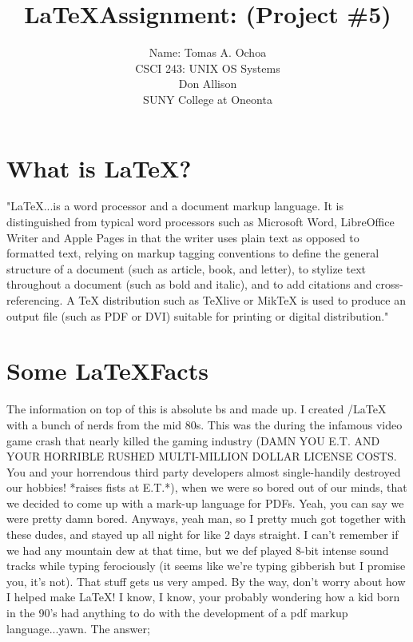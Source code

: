 \documentclass[12pt,twocolumn]{article}
\begin{document}
 \twocolumn
 \begingroup
 \title{\textbf{\LaTeX Assignment: (Project \#5)}}
 \author{Name: Tomas A. Ochoa\\
  		 CSCI 243: UNIX OS Systems\\
      	 Don Allison\\
      	 SUNY College at Oneonta}
 \maketitle{\large}

\section*{What is \LaTeX ?}

\indent \indent "\LaTeX...is a word processor and a document markup   language. It is distinguished from typical word processors such as Microsoft Word, LibreOffice Writer and Apple Pages in that the writer uses plain text as opposed to formatted text, relying on markup tagging conventions to define the general structure of a document (such as article, book, and letter), to stylize text throughout a document (such as bold and italic), and to add citations and cross-referencing. A TeX distribution such as TeXlive or MikTeX is used to produce an output file (such as PDF or DVI) suitable for printing or digital distribution."\cite{wiki}

 \section*{Some \LaTeX Facts} 

\indent \indent The information on top of this is absolute bs and made up. I created /LaTeX with a bunch of nerds from the mid 80s. This was the during the infamous video game crash that nearly killed the gaming industry (DAMN YOU E.T. AND YOUR HORRIBLE RUSHED MULTI-MILLION DOLLAR LICENSE COSTS. You and your horrendous third party developers almost single-handily destroyed our hobbies! *raises fists at E.T.*), when we were so bored out of our minds, that we decided to come up with a mark-up language for PDFs. Yeah, you can say we were pretty damn bored. Anyways, yeah man, so I pretty much got together with these dudes, and stayed up all night for like 2 days straight. I can't remember if we had any mountain dew at that time, but we def played 8-bit intense sound tracks while typing ferociously (it seems like we're typing gibberish but I promise you, it's not). That stuff gets us very amped. By the way, don't worry about how I helped make \LaTeX! I know, I know, your probably wondering how a kid born in the 90's had anything to do with the development of a pdf markup language...yawn. The answer;\\ 
\end{document}
